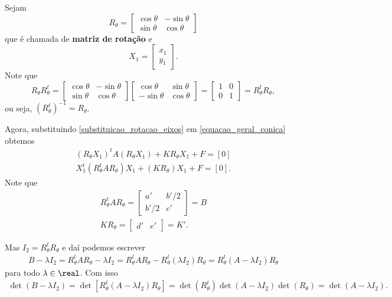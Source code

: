 Sejam
\[
  R_\theta = \begin{bmatrix}
    \cos\theta & -\sin\theta\\
    \sin\theta & \cos\theta
  \end{bmatrix}
\]
que é chamada de \textbf{matriz de rotação} e
\[
  X_1 = \begin{bmatrix}x_1\\y_1\end{bmatrix}.
\]
Note que
\[
  R_\theta R_\theta^t = \begin{bmatrix}
    \cos\theta & -\sin\theta\\
    \sin\theta & \cos\theta
  \end{bmatrix}\begin{bmatrix}
    \cos\theta & \sin\theta\\
    -\sin\theta & \cos\theta
  \end{bmatrix} = \begin{bmatrix}
    1 & 0\\
    0 & 1
  \end{bmatrix} = R_\theta^t R_\theta,
\]
ou seja, $(R_\theta^t)^{-1} = R_\theta$.

Agora, substituindo \eqref{substituicao_rotacao_eixos} em \eqref{equacao_geral_conica} obtemos
\begin{align*}
  (R_\theta X_1)^t A (R_\theta X_1) + KR_\theta X_1 + F = [0]\\
  X_1^t(R_\theta^t A R_\theta)X_1 + (KR_\theta)X_1 + F = [0].
\end{align*}
Note que
\begin{align*}
  R_\theta^t A R_\theta = \begin{bmatrix}
    a' & b'/2\\
    b'/2 & c'
  \end{bmatrix} = B\\
  KR_\theta = \begin{bmatrix}
    d'& e'
  \end{bmatrix} = K'.
\end{align*}

Mas $I_2 = R_\theta^t R_\theta$ e daí podemos escrever
\begin{align*}
  B - \lambda I_2 = R_\theta^t A R_\theta - \lambda I_2 = R_\theta^t A R_\theta - R_\theta^t (\lambda I_2) R_\theta = R_\theta^t (A - \lambda I_2)R_\theta
\end{align*}
para todo $\lambda \in \real$. Com isso
\begin{align*}
  \det(B - \lambda I_2) = \det[R_\theta^t(A - \lambda I_2)R_\theta] = \det(R_\theta^t)\det(A - \lambda I_2)\det(R_\theta) = \det(A - \lambda I_2).
\end{align*}


